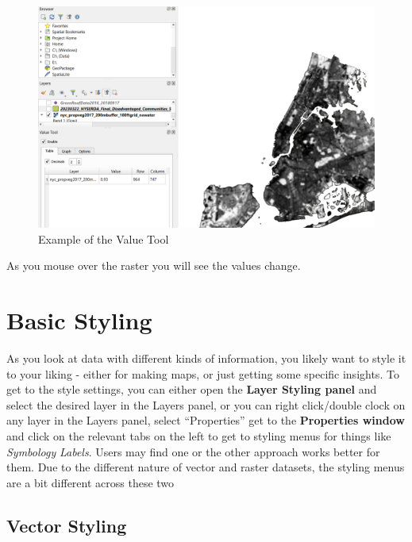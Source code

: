 \documentclass[
  letterpaper,
  DIV=11,
  numbers=noendperiod]{scrreprt}
\begin{document}
\begin{figure}

{\centering \includegraphics{./images/ValueToolExample.png}

}

\caption{Example of the Value Tool}

\end{figure}

As you mouse over the raster you will see the values change.

\hypertarget{basic-styling}{%
\section{Basic Styling}\label{basic-styling}}

As you look at data with different kinds of information, you likely want
to style it to your liking - either for making maps, or just getting
some specific insights. To get to the style settings, you can either
open the \textbf{Layer Styling panel} and select the desired layer in
the Layers panel, or you can right click/double clock on any layer in
the Layers panel, select ``Properties'' get to the \textbf{Properties
window} and click on the relevant tabs on the left to get to styling
menus for things like \emph{Symbology} \emph{Labels}. Users may find one
or the other approach works better for them. Due to the different nature
of vector and raster datasets, the styling menus are a bit different
across these two

\hypertarget{vector-styling}{%
\subsection{Vector Styling}\label{vector-styling}}
\end{document}
